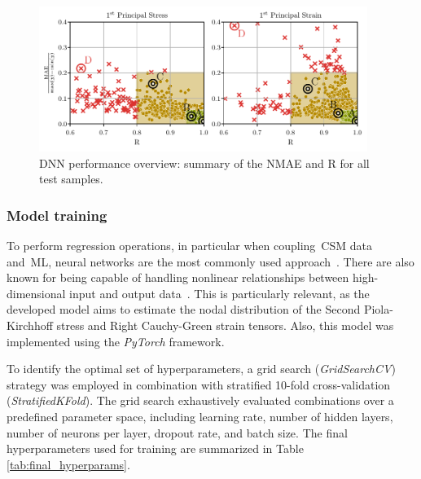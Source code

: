 \documentclass[a4paper,fleqn]{cas-sc}
\begin{document}
    \begin{figure}
      \centering
      \includegraphics[width=0.95\textwidth]{fig3}
      \caption{\gls{DNN} performance overview: summary of the NMAE and R for all test samples.}
      \label{fig:performance_overview}
    \end{figure}

  \subsubsection{Model training}
    To perform regression operations, in particular when coupling~\gls{CSM} data and~\gls{ML}, neural networks are the most commonly used approach~\cite{phellan2021}. There are also known for being capable of handling nonlinear relationships between high-dimensional input and output data~\cite{Liang2018b}. This is particularly relevant, as the developed model aims to estimate the nodal distribution of the Second Piola-Kirchhoff stress and Right Cauchy-Green strain tensors. Also, this model was implemented using the \textit{PyTorch} framework.
    
    To identify the optimal set of hyperparameters, a grid search (\textit{GridSearchCV}) strategy was employed in combination with stratified 10-fold cross-validation (\textit{StratifiedKFold}). The grid search exhaustively evaluated combinations over a predefined parameter space, including learning rate, number of hidden layers, number of neurons per layer, dropout rate, and batch size. The final hyperparameters used for training are summarized in Table \ref{tab:final_hyperparams}. 
    
\end{document}
